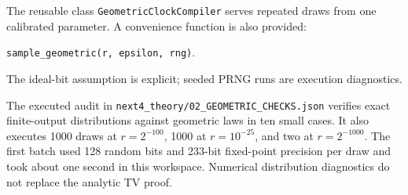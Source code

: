 The reusable class \texttt{GeometricClockCompiler} serves repeated draws
from one calibrated parameter. A convenience function is also provided:
\begin{center}\texttt{sample\_geometric(r, epsilon, rng)}.\end{center}
The ideal-bit assumption is
explicit; seeded PRNG runs are execution diagnostics.

The executed audit in \texttt{next4\_theory/02\_GEOMETRIC\_CHECKS.json}
verifies exact finite-output distributions against geometric laws in
ten small cases. It also executes 1000 draws at $r=2^{-100}$, 1000 at
$r=10^{-25}$, and two at $r=2^{-1000}$. The first batch used 128 random
bits and 233-bit fixed-point precision per draw and took about one
second in this workspace. Numerical distribution diagnostics do not
replace the analytic TV proof.
